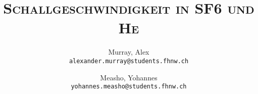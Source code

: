 \author{%
    Murray, Alex\\
    \texttt{alexander.murray@students.fhnw.ch}
    \and
    Measho, Yohannes\\
    \texttt{yohannes.measho@students.fhnw.ch}
}

\title{
    \vspace{20mm}
    \Huge{\textsc{Schallgeschwindigkeit in SF6 und He}}
}
